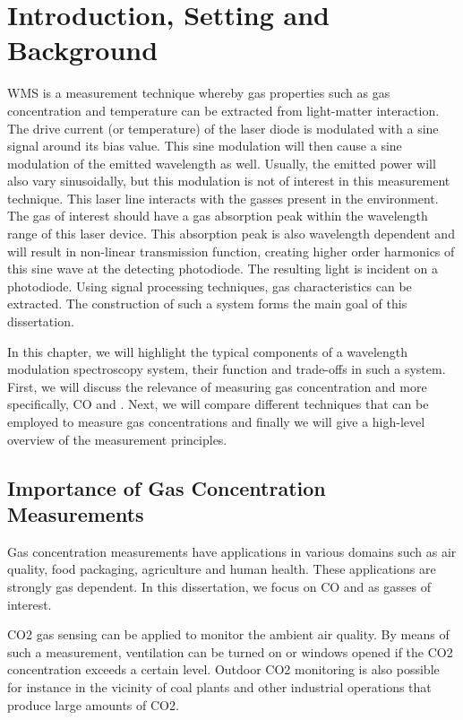 \documentclass[\home/main.tex]{subfiles}
\begin{document}
\chapter{Introduction, Setting and Background}\label{background:setting-and-background}

\Acrfull{WMS} is a measurement technique where\-by gas properties such as gas concentration and temperature can be extracted from light-matter interaction. The drive current (or temperature) of the laser diode is modulated with a sine signal around its bias value. This sine modulation will then cause a sine modulation of the emitted wavelength as well. Usually, the emitted power will also vary sinusoidally, but this modulation is not of interest in this measurement technique. This laser line interacts with the gasses present in the environment. The gas of interest should have a gas absorption peak within the wavelength range of this laser device. This absorption peak is also wavelength dependent and will result in non-linear transmission function, creating higher order harmonics of this sine wave at the detecting photodiode. The resulting light is incident on a photodiode. Using signal processing techniques, gas characteristics can be extracted. The construction of such a system forms the main goal of this dissertation. 

In this chapter, we will highlight the typical components of a wavelength modulation spectroscopy system, their function and trade-offs in such a system. First, we will discuss the relevance of measuring gas concentration and more specifically, \gls{CO} and . Next, we will compare different techniques that can be employed to measure gas concentrations and finally we will give a high-level overview of the measurement principles.

\section{Importance of Gas Concentration Measurements}

  Gas concentration measurements have applications in various domains such as air quality, food packaging, agriculture and human health. These applications are strongly gas dependent. In this dissertation, we focus on \acrshort{CO} and  as gasses of interest.
  
  \acrshort{CO2} gas sensing can be applied to monitor the ambient air quality. By means of such a measurement, ventilation can be turned on or windows opened if the \gls{CO2} concentration exceeds a certain level. Outdoor \acrshort{CO2} monitoring is also possible for instance in the vicinity of coal plants and other industrial operations that produce large amounts of \gls{CO2}. 
  
\end{document}
